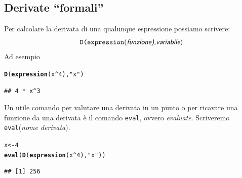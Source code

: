 \documentclass[onecolumn,11pt]{book}\usepackage[]{graphicx}\usepackage[]{color}
\makeatletter
\newcommand{\hlnum}[1]{\textcolor[rgb]{0.686,0.059,0.569}{#1}}%
\newcommand{\hlstr}[1]{\textcolor[rgb]{0.192,0.494,0.8}{#1}}%
\newcommand{\hlopt}[1]{\textcolor[rgb]{0,0,0}{#1}}%
\newcommand{\hlstd}[1]{\textcolor[rgb]{0.345,0.345,0.345}{#1}}%
\newcommand{\hlkwb}[1]{\textcolor[rgb]{0.69,0.353,0.396}{#1}}%
\newcommand{\hlkwd}[1]{\textcolor[rgb]{0.737,0.353,0.396}{\textbf{#1}}}%
\newenvironment{kframe}{%
 \def\at@end@of@kframe{}%
 \ifinner\ifhmode%
  \def\at@end@of@kframe{\end{minipage}}%
  \begin{minipage}{\columnwidth}%
 \fi\fi%
 \def\FrameCommand##1{\hskip\@totalleftmargin \hskip-\fboxsep
 \colorbox{shadecolor}{##1}\hskip-\fboxsep
     \hskip-\linewidth \hskip-\@totalleftmargin \hskip\columnwidth}%
 \MakeFramed {\advance\hsize-\width
   \@totalleftmargin\z@ \linewidth\hsize
   \@setminipage}}%
 {\par\unskip\endMakeFramed%
 \at@end@of@kframe}
\newenvironment{knitrout}{}{} %
\newcommand{\varia}[1]{\textsl{\textsf{#1}}}
\makeatother
\begin{document}
\subsection{Derivate ``formali''}
Per calcolare la derivata di una qualunque espressione possiamo scrivere:
\begin{equation*}\texttt{D(expression}(\varia{funzione),variabile})
\end{equation*}
Ad esempio

\begin{knitrout}
\color{fgcolor}\begin{kframe}
\begin{alltt}
\hlkwd{D}\hlstd{(}\hlkwd{expression}\hlstd{(x}\hlopt{^}\hlnum{4}\hlstd{),}\hlstr{"x"}\hlstd{)}
\end{alltt}
\begin{verbatim}
## 4 * x^3
\end{verbatim}
\end{kframe}
\end{knitrout}
Un utile comando per valutare una derivata in un punto o per  ricavare una funzione da una derivata \`e il comando \texttt{eval}, ovvero {\it evaluate}. Scriveremo \texttt{eval}(\varia{nome derivata}).

\begin{knitrout}
\color{fgcolor}\begin{kframe}
\begin{alltt}
\hlstd{x}\hlkwb{<-}\hlnum{4}
\hlkwd{eval}\hlstd{(}\hlkwd{D}\hlstd{(}\hlkwd{expression}\hlstd{(x}\hlopt{^}\hlnum{4}\hlstd{),}\hlstr{"x"}\hlstd{))}
\end{alltt}
\begin{verbatim}
## [1] 256
\end{verbatim}
\end{kframe}
\end{knitrout}
\end{document}

